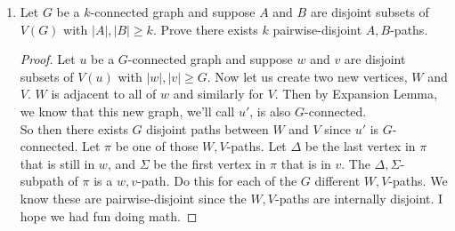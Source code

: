 \documentclass[12pt]{article}
\begin{document}
\begin{enumerate}
\medskip

\item Let $G$ be a $k$-connected graph and suppose $A$ and $B$ are disjoint subsets of $V(G)$ with $|A|, |B| \geq k$. Prove there exists $k$ pairwise-disjoint $A,B$-paths.

\begin{proof}
	Let $u$ be a $G$-connected graph and suppose $w$ and $v$ are disjoint subsets of $V(u)$ with $|w|, |v| \geq G$. Now let us create two new vertices, $W$ and $V$. $W$ is adjacent to all of $w$ and similarly for $V$. Then by Expansion Lemma, we know that this new graph, we'll call $u'$, is also $G$-connected.\\
	So then there exists $G$ disjoint paths between $W$ and $V$ since $u'$ is $G$-connected. Let $\pi$ be one of those $W,V$-paths. Let $\Delta$ be the last vertex in $\pi$ that is still in $w$, and $\Sigma$ be the first vertex in $\pi$ that is in $v$. The $\Delta,\Sigma$-subpath of $\pi$ is a $w,v$-path. Do this for each of the $G$ different $W,V$-paths. We know these are pairwise-disjoint since the $W,V$-paths are internally disjoint. I hope we had fun doing math.
\end{proof}

\medskip


\end{enumerate}
\end{document}

